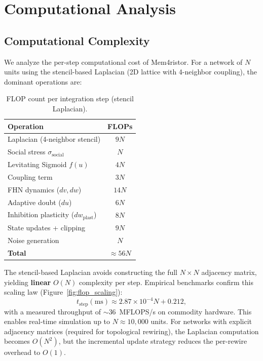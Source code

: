 \documentclass[11pt]{article}
\begin{document}
\section{Computational Analysis}
\label{sec:computational}

\subsection{Computational Complexity}

We analyze the per-step computational cost of Mem4ristor. For a network of $N$ units using the stencil-based Laplacian (2D lattice with 4-neighbor coupling), the dominant operations are:

\begin{table}[h]
\centering
\caption{FLOP count per integration step (stencil Laplacian).}
\label{tab:flops}
\begin{tabular}{lc}
\toprule
\textbf{Operation} & \textbf{FLOPs} \\
\midrule
Laplacian (4-neighbor stencil) & $9N$ \\
Social stress $\sigma_{\text{social}}$ & $N$ \\
Levitating Sigmoid $f(u)$ & $4N$ \\
Coupling term & $3N$ \\
FHN dynamics ($dv, dw$) & $14N$ \\
Adaptive doubt ($du$) & $6N$ \\
Inhibition plasticity ($dw_{\text{plast}}$) & $8N$ \\
State updates + clipping & $9N$ \\
Noise generation & $N$ \\
\midrule
\textbf{Total} & $\approx 56N$ \\
\bottomrule
\end{tabular}
\end{table}

The stencil-based Laplacian avoids constructing the full $N \times N$ adjacency matrix, yielding \textbf{linear} $O(N)$ complexity per step. Empirical benchmarks confirm this scaling law (Figure~\ref{fig:flop_scaling}):
\begin{equation}
    t_{\text{step}}(\text{ms}) \approx 2.87 \times 10^{-4} N + 0.212,
    \label{eq:scaling}
\end{equation}
with a measured throughput of $\sim$36~MFLOPS/s on commodity hardware. This enables real-time simulation up to $N \approx 10{,}000$ units. For networks with explicit adjacency matrices (required for topological rewiring), the Laplacian computation becomes $O(N^2)$, but the incremental update strategy reduces the per-rewire overhead to $O(1)$.
\end{document}
